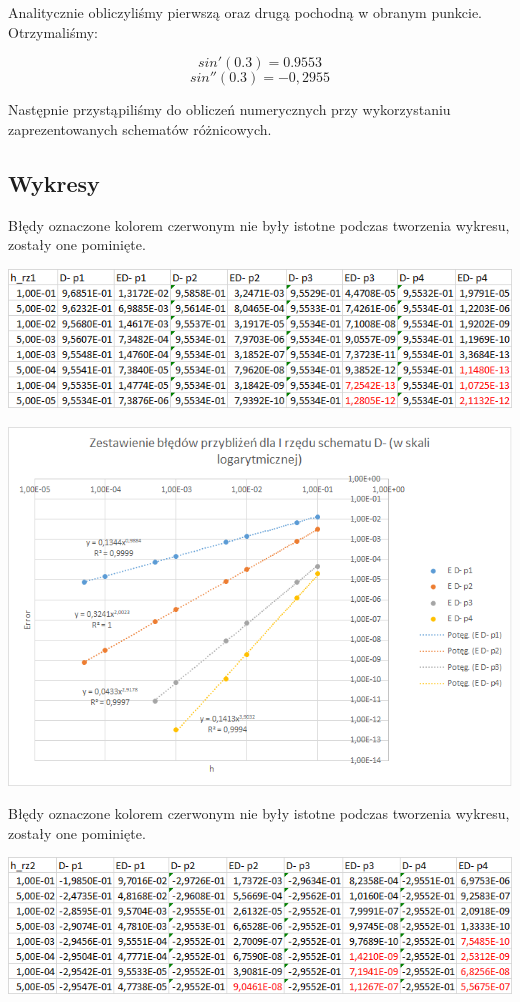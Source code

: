 Analitycznie obliczyliśmy pierwszą oraz drugą pochodną w obranym punkcie. Otrzymaliśmy:

$$sin'(0.3)=0.9553$$
$$sin''(0.3)=-0,2955$$

Następnie przystąpiliśmy do obliczeń numerycznych przy wykorzystaniu zaprezentowanych schematów różnicowych.
\newpage
\subsection{Wykresy}
\vspace{0.3cm}
Błędy oznaczone kolorem czerwonym nie były istotne podczas tworzenia wykresu, zostały one pominięte.

\includegraphics{Lab2/charts/rz1_log_Db_dane.png}

\includegraphics{Lab2/charts/rz1_log_Db.png} 
\newpage

Błędy oznaczone kolorem czerwonym nie były istotne podczas tworzenia wykresu, zostały one pominięte.

\includegraphics{Lab2/charts/rz2_log_Db_dane.png}

